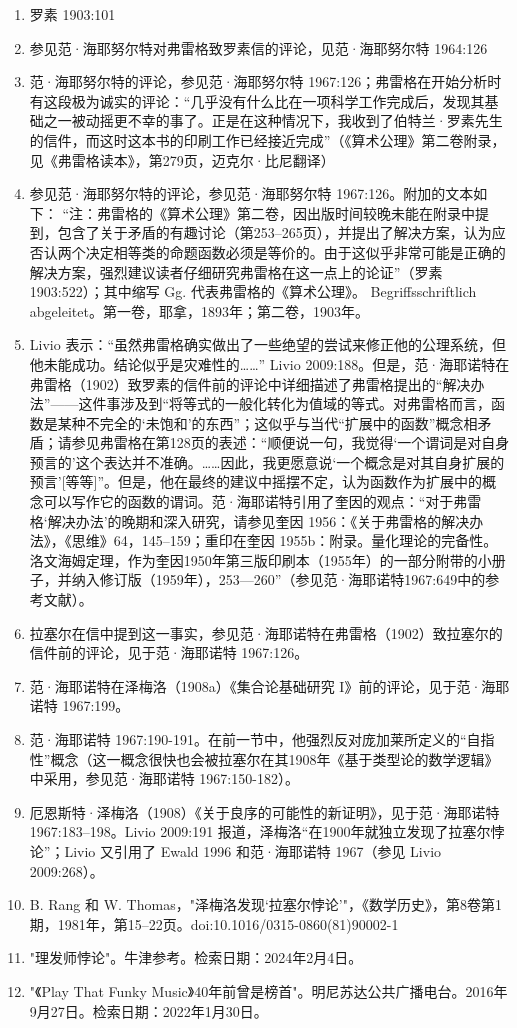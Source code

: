 \begin{enumerate}
\item 罗素 1903:101  
\item 参见范·海耶努尔特对弗雷格致罗素信的评论，见范·海耶努尔特 1964:126  
\item 范·海耶努尔特的评论，参见范·海耶努尔特 1967:126；弗雷格在开始分析时有这段极为诚实的评论：“几乎没有什么比在一项科学工作完成后，发现其基础之一被动摇更不幸的事了。正是在这种情况下，我收到了伯特兰·罗素先生的信件，而这时这本书的印刷工作已经接近完成”（《算术公理》第二卷附录，见《弗雷格读本》，第279页，迈克尔·比尼翻译）
\item 参见范·海耶努尔特的评论，参见范·海耶努尔特 1967:126。附加的文本如下：
“注：弗雷格的《算术公理》第二卷，因出版时间较晚未能在附录中提到，包含了关于矛盾的有趣讨论（第253–265页），并提出了解决方案，认为应否认两个决定相等类的命题函数必须是等价的。由于这似乎非常可能是正确的解决方案，强烈建议读者仔细研究弗雷格在这一点上的论证”（罗素 1903:522）；其中缩写 Gg. 代表弗雷格的《算术公理》。 Begriffsschriftlich abgeleitet。第一卷，耶拿，1893年；第二卷，1903年。
\item Livio 表示：“虽然弗雷格确实做出了一些绝望的尝试来修正他的公理系统，但他未能成功。结论似乎是灾难性的……” Livio 2009:188。但是，范·海耶诺特在弗雷格（1902）致罗素的信件前的评论中详细描述了弗雷格提出的“解决办法”——这件事涉及到“将等式的一般化转化为值域的等式。对弗雷格而言，函数是某种不完全的‘未饱和’的东西”；这似乎与当代“扩展中的函数”概念相矛盾；请参见弗雷格在第128页的表述：“顺便说一句，我觉得‘一个谓词是对自身预言的’这个表达并不准确。……因此，我更愿意说‘一个概念是对其自身扩展的预言’[等等]”。但是，他在最终的建议中摇摆不定，认为函数作为扩展中的概念可以写作它的函数的谓词。范·海耶诺特引用了奎因的观点：“对于弗雷格‘解决办法’的晚期和深入研究，请参见奎因 1956：《关于弗雷格的解决办法》，《思维》64，145–159；重印在奎因 1955b：附录。量化理论的完备性。洛文海姆定理，作为奎因1950年第三版印刷本（1955年）的一部分附带的小册子，并纳入修订版（1959年），253—260”（参见范·海耶诺特1967:649中的参考文献）。
\item 拉塞尔在信中提到这一事实，参见范·海耶诺特在弗雷格（1902）致拉塞尔的信件前的评论，见于范·海耶诺特 1967:126。  
\item 范·海耶诺特在泽梅洛（1908a）《集合论基础研究 I》前的评论，见于范·海耶诺特 1967:199。  
\item 范·海耶诺特 1967:190-191。在前一节中，他强烈反对庞加莱所定义的“自指性”概念（这一概念很快也会被拉塞尔在其1908年《基于类型论的数学逻辑》中采用，参见范·海耶诺特 1967:150-182）。
\item 厄恩斯特·泽梅洛（1908）《关于良序的可能性的新证明》，见于范·海耶诺特 1967:183–198。Livio 2009:191 报道，泽梅洛“在1900年就独立发现了拉塞尔悖论”；Livio 又引用了 Ewald 1996 和范·海耶诺特 1967（参见 Livio 2009:268）。  
\item B. Rang 和 W. Thomas，"泽梅洛发现‘拉塞尔悖论’"，《数学历史》，第8卷第1期，1981年，第15–22页。doi:10.1016/0315-0860(81)90002-1  
\item "理发师悖论"。牛津参考。检索日期：2024年2月4日。  
\item "《Play That Funky Music》40年前曾是榜首"。明尼苏达公共广播电台。2016年9月27日。检索日期：2022年1月30日。
\end{enumerate}
